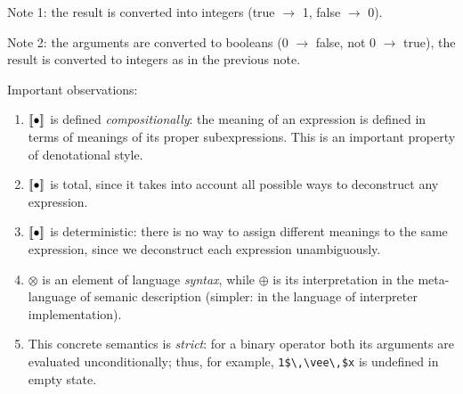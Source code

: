Note 1: the result is converted into integers (true $\to$ 1, false $\to$ 0).

Note 2: the arguments are converted to booleans (0 $\to$ false, not 0 $\to$ true), the result is converted to
integers as in the previous note.

Important observations:

\begin{enumerate}
  \item $\llbracket{\bullet}\rrbracket$ is defined \emph{compositionally}: the meaning of an expression is defined in terms of meanings
  of its proper subexpressions. This is an important property of denotational style.
  \item $\llbracket{\bullet}\rrbracket$ is total, since it takes into account all possible ways to deconstruct any expression.
  \item $\llbracket{\bullet}\rrbracket$ is deterministic: there is no way to assign different meanings to the same expression, since
  we deconstruct each expression unambiguously.
  \item $\otimes$ is an element of language \emph{syntax}, while $\oplus$ is its interpretation in the meta-language of
  semanic description (simpler: in the language of interpreter implementation).
  \item This concrete semantics is \emph{strict}: for a binary operator both its arguments are evaluated unconditionally; thus,
  for example, \lstinline|1$\,\vee\,$x| is undefined in empty state.
\end{enumerate}
